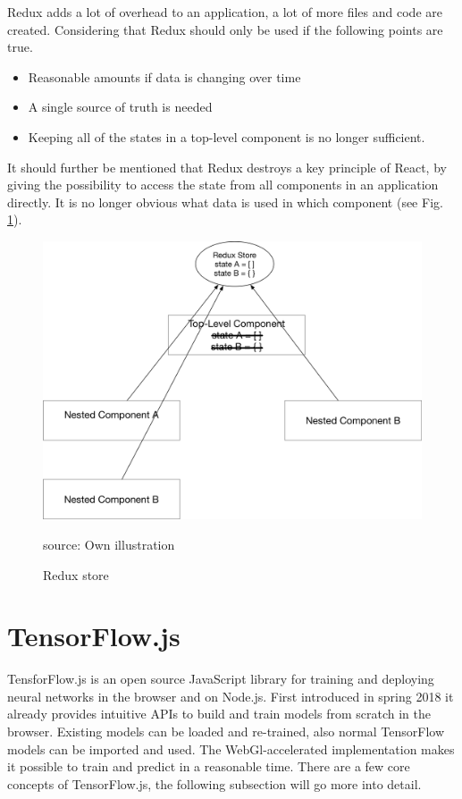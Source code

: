 Redux adds a lot of overhead to an application, a lot of more files and code are created. Considering that Redux should only be used if the following points are true. 

\begin{itemize}
\item Reasonable amounts if data is changing over time
\item A single source of truth is needed
\item Keeping all of the states in a top-level component is no longer sufficient.
\end{itemize}

It should further be mentioned that Redux destroys a key principle of React, by giving the possibility to access the state from all components in an application directly. It is no longer obvious what data is used in which component (see Fig. \ref{fig:Redux}).
\begin{figure}[H]
	\centering
	\includegraphics[width=0.8\linewidth]{bilder/grundlagen/reduxStore.png}
	\caption{Redux store} source: Own illustration
	\label{fig:Redux}
\end{figure}

\section{TensorFlow.js}
TensforFlow.js is an open source JavaScript library for training and deploying neural networks in the browser and on Node.js. First introduced in spring 2018 it already provides intuitive APIs to build and train models from scratch in the browser. Existing models can be loaded and re-trained, also normal TensorFlow models can be imported and used. The WebGl-accelerated implementation makes it possible to train and predict in a reasonable time. There are a few core concepts of TensorFlow.js, the following subsection will go more into detail.

